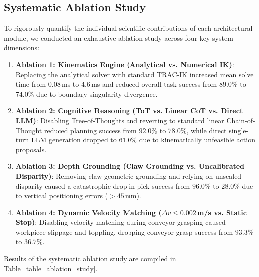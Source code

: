 \documentclass[journal]{IEEEtran}
\begin{document}
\subsection{Systematic Ablation Study}
To rigorously quantify the individual scientific contributions of each architectural module, we conducted an exhaustive ablation study across four key system dimensions:
\begin{enumerate}
    \item \textbf{Ablation 1: Kinematics Engine (Analytical vs. Numerical IK)}: Replacing the analytical solver with standard TRAC-IK increased mean solve time from $0.08$\,ms to $4.6$\,ms and reduced overall task success from $89.0\%$ to $74.0\%$ due to boundary singularity divergence.
    \item \textbf{Ablation 2: Cognitive Reasoning (ToT vs. Linear CoT vs. Direct LLM)}: Disabling Tree-of-Thoughts and reverting to standard linear Chain-of-Thought reduced planning success from $92.0\%$ to $78.0\%$, while direct single-turn LLM generation dropped to $61.0\%$ due to kinematically unfeasible action proposals.
    \item \textbf{Ablation 3: Depth Grounding (Claw Grounding vs. Uncalibrated Disparity)}: Removing claw geometric grounding and relying on unscaled disparity caused a catastrophic drop in pick success from $96.0\%$ to $28.0\%$ due to vertical positioning errors ($>45$\,mm).
    \item \textbf{Ablation 4: Dynamic Velocity Matching ($\Delta v \le 0.002$\,m/s vs. Static Stop)}: Disabling velocity matching during conveyor grasping caused workpiece slippage and toppling, dropping conveyor grasp success from $93.3\%$ to $36.7\%$.
\end{enumerate}

Results of the systematic ablation study are compiled in Table~\ref{table_ablation_study}.
\end{document}
